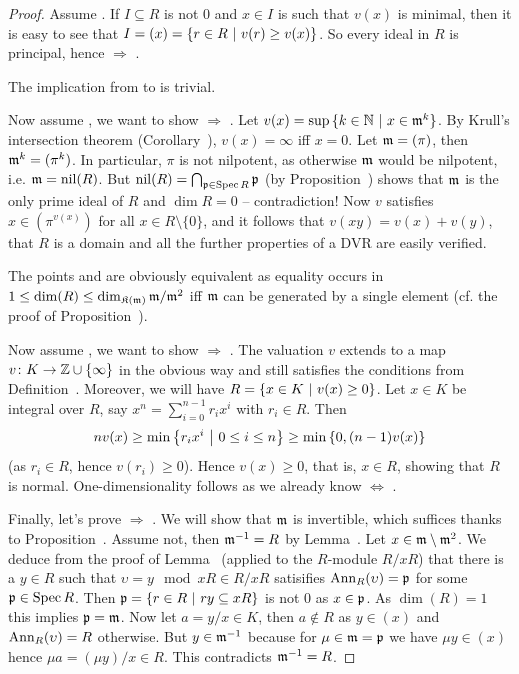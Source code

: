 \documentclass[a4paper,parskip=half,numbers=enddot, DIV=12]{scrreprt}
\begin{document}
\begin{proof}
    Assume . If $I\subseteq R$ is not $0$ and $x\in I$ is such that $v(x)$ is minimal, then it is easy to see that $I = (x) = \left\{r\in R\ \middle|\  v(r) \geq v(x)\right\}$. So every ideal in $R$ is principal, hence  $\Rightarrow$ .
    
    The implication from  to  is trivial.
    
    Now assume , we want to show  $\Rightarrow$ . Let $v(x) = \sup\left\{k\in \mathbb{N} \ \middle|\  x\in \smash{\mathfrak{m}^k}\right\}$. By Krull's intersection theorem (Corollary~), $v(x) = \infty$ iff $x=0$. Let $\mathfrak{m} = (\pi)$, then $\mathfrak{m}^k = (\pi^k)$. In particular, $\pi$ is not nilpotent, as otherwise $\mathfrak{m}$ would be nilpotent, i.e. $\mathfrak{m}=\operatorname{nil}(R)$. But $\operatorname{nil}(R)=\bigcap_{\mathfrak{p}\in\operatorname{Spec} R}\mathfrak{p}$ (by Proposition~) shows that $\mathfrak{m}$ is the only prime ideal of $R$ and $\dim R = 0$ -- contradiction! Now $v$ satisfies $x\in (\pi^{v(x)})$ for all $x\in R\setminus\{0\}$, and it follows that $v(xy) = v(x) + v(y)$, that $R$ is a domain and all the further properties of a DVR are easily verified.
    
    The points  and  are obviously equivalent as equality occurs in $1\leq\dim(R)\leq\dim_{\mathfrak{K}(\mathfrak{m})}\mathfrak{m}/\mathfrak{m}^2$ iff $\mathfrak{m}$ can be generated by a single element (cf. the proof of Proposition~).
    
    Now assume , we want to show  $\Rightarrow$ . The valuation $v$ extends to a map $v\colon K\morphism\IZ\cup\{\infty\}$ in the obvious way and still satisfies the conditions from Definition~. Moreover, we will have $R=\left\{x\in K\ \middle|\  v(x)\geq 0\right\}$. Let $x\in K$ be integral over $R$, say $x^n = \sum_{i=0}^{n-1} r_i x^i$ with $r_i \in R$. Then 
    \begin{align*}
    	nv(x) \geq \min \left \{r_ix^i\ \middle|\  0\leq i\leq n\right\} \geq \min\left\{ 0, (n-1)v(x)\right\}
    \end{align*}
     (as $r_i\in R$, hence $v(r_i)\geq 0$). Hence $v(x)\geq 0$, that is, $x\in R$, showing that $R$ is normal. One-dimensionality follows as we already know  $\Leftrightarrow$ .
    
    Finally, let's prove  $\Rightarrow$ . We will show that $\mathfrak{m}$ is invertible, which suffices thanks to Proposition~. Assume not, then $\mathfrak{m}^{-1}=R$ by Lemma~. Let $x\in \mathfrak{m}\setminus \mathfrak{m}^2$. We deduce from the proof of Lemma~ (applied to the $R$-module $R/xR$) that there is a $y\in R$ such that $\upsilon = y\mod xR\in R/xR$ satisifies $\operatorname{Ann}_R(\upsilon) = \mathfrak{p}$ for some $\mathfrak{p}\in \operatorname{Spec} R$. Then $\mathfrak{p} = \left\{r\in R\ \middle|\  ry\subseteq xR\right\}$ is not 0 as $x\in\mathfrak{p}$. As $\dim(R) = 1$ this implies $\mathfrak{p} = \mathfrak{m}$. Now let $a=y/x\in K$, then $a\not \in R$ as $y\in (x)$ and $\operatorname{Ann}_R(\upsilon)=R$ otherwise. But $y\in \mathfrak{m}^{-1}$ because for $\mu\in\mathfrak{m} = \mathfrak{p}$ we have $\mu y\in (x)$ hence $\mu a = (\mu y)/x\in R$. This contradicts $\mathfrak{m}^{-1}=R$.
\end{proof}
\end{document}
